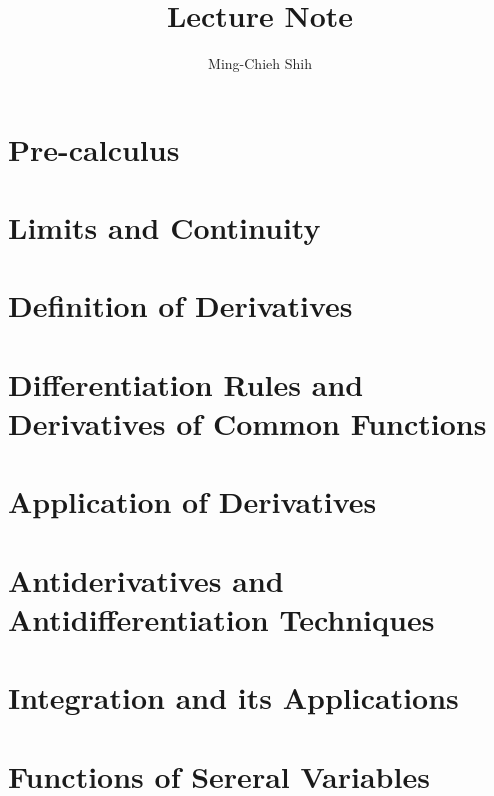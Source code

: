 \documentclass{easyclass}
\begin{document}
\begin{titlepage}
    \title{Lecture Note}
    \author{Ming-Chieh Shih}
    \maketitle
\end{titlepage}

\tableofcontents

\chapter{Pre-calculus}


\chapter{Limits and Continuity}


\chapter{Definition of Derivatives}


\chapter{Differentiation Rules and Derivatives of Common Functions}


\chapter{Application of Derivatives}


\chapter{Antiderivatives and Antidifferentiation Techniques}


\chapter{Integration and its Applications}


\chapter{Functions of Sereral Variables}


%
\end{document}
